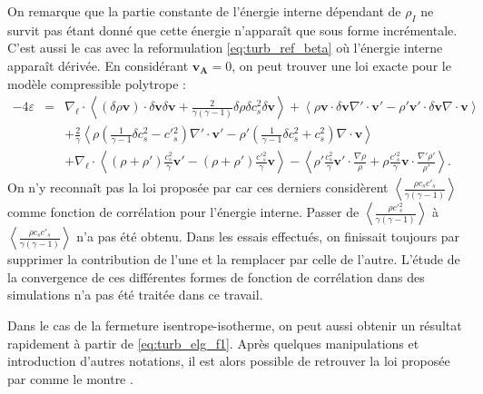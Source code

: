 On remarque que la partie constante de l'énergie interne dépendant de $\rho_I$ ne survit pas étant donné que cette énergie n'apparaît que sous forme incrémentale. C'est aussi le cas avec la reformulation \eqref{eq:turb_ref_beta} où l'énergie interne apparaît dérivée. En considérant $\boldsymbol{v_A} = 0$, on peut trouver une loi exacte pour le modèle  compressible polytrope :  
\begin{eqnarray}
-4\varepsilon &=& \nabla_{\boldsymbol{\ell}} \cdot \left<\left(\delta \rho\boldsymbol{v}\right) \cdot \delta \boldsymbol{v}\delta \boldsymbol{v} + \frac{2}{\gamma\left(\gamma-1\right)} \delta \rho  \delta c^2_s \delta \boldsymbol{v}\right> +\left< \rho \boldsymbol{v} \cdot \delta \boldsymbol{v}  \nabla' \cdot \boldsymbol{v'} - \rho' \boldsymbol{v'} \cdot \delta \boldsymbol{v} \nabla \cdot \boldsymbol{v}\right>\nonumber\\
&&+   \frac{2}{\gamma} \left<\rho \left(\frac{1}{\gamma-1} \delta c^2_s - c'{}^2_s\right)\nabla' \cdot \boldsymbol{v'}  - \rho' \left(\frac{1}{\gamma-1}\delta c^2_s + c^2_s\right) \nabla \cdot \boldsymbol{v} \right>\\
&&+  \nabla_{\boldsymbol{\ell}} \cdot \left< \left(\rho+\rho'\right) \frac{c^2_s}{\gamma} \boldsymbol{v'} -  \left(\rho+\rho'\right) \frac{c'{}^2_s}{\gamma}  \boldsymbol{v} \right> - \left<\rho' \frac{c^2_s}{\gamma}  \boldsymbol{v'} \cdot \frac{\nabla \rho}{\rho} + \rho \frac{c'{}^2_s}{\gamma} \boldsymbol{v} \cdot \frac{\nabla' \rho'}{\rho'} \right> .\nonumber
\end{eqnarray} 
On n'y reconnaît pas la loi proposée par \cite{banerjee_kolmogorov-like_2014} car ces derniers considèrent $\left<\frac{\rho c_s c'_s}{\gamma\left(\gamma-1\right)}\right>$ comme fonction de corrélation pour l'énergie interne. Passer de $\left<\frac{\rho c'{}^2_s }{\gamma\left(\gamma-1\right)}\right>$ à $\left<\frac{\rho c_s c'_s}{\gamma\left(\gamma-1\right)}\right>$ n'a pas été obtenu. Dans les essais effectués, on finissait toujours par supprimer la contribution de l'une et la remplacer par celle de l'autre. L'étude de la convergence de ces différentes formes de fonction de corrélation dans des simulations n'a pas été traitée dans ce travail.

Dans le cas de la fermeture isentrope-isotherme, on peut aussi obtenir un résultat rapidement à partir de \eqref{eq:turb_elg_f1}. Après quelques manipulations et introduction d'autres notations, il est alors possible de retrouver la loi proposée par \cite{andres_alternative_2017} comme le montre \cite{simon_general_2021}.

